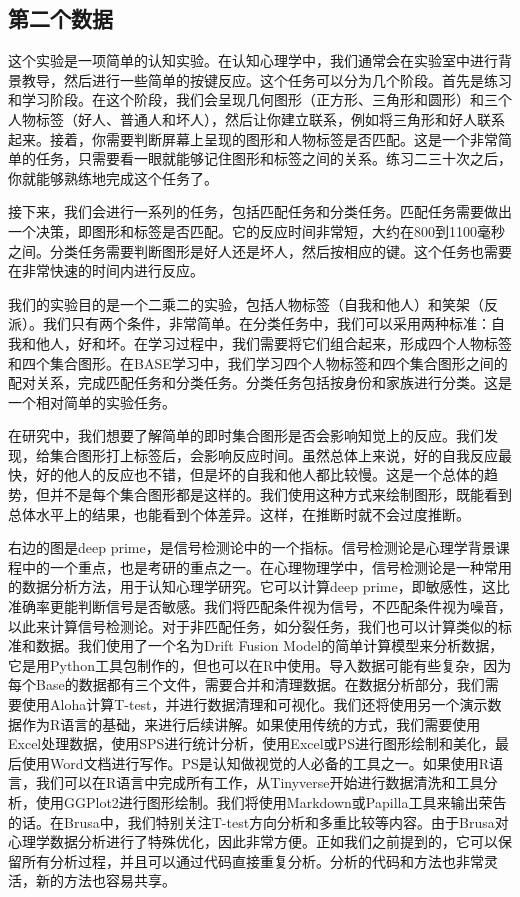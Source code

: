 \documentclass[
  oneside]{book}
\begin{document}
\hypertarget{2-data-2}{%
\subsection{第二个数据}\label{2-data-2}}

这个实验是一项简单的认知实验。在认知心理学中，我们通常会在实验室中进行背景教导，然后进行一些简单的按键反应。这个任务可以分为几个阶段。首先是练习和学习阶段。在这个阶段，我们会呈现几何图形（正方形、三角形和圆形）和三个人物标签（好人、普通人和坏人），然后让你建立联系，例如将三角形和好人联系起来。接着，你需要判断屏幕上呈现的图形和人物标签是否匹配。这是一个非常简单的任务，只需要看一眼就能够记住图形和标签之间的关系。练习二三十次之后，你就能够熟练地完成这个任务了。

接下来，我们会进行一系列的任务，包括匹配任务和分类任务。匹配任务需要做出一个决策，即图形和标签是否匹配。它的反应时间非常短，大约在800到1100毫秒之间。分类任务需要判断图形是好人还是坏人，然后按相应的键。这个任务也需要在非常快速的时间内进行反应。

我们的实验目的是一个二乘二的实验，包括人物标签（自我和他人）和笑架（反派）。我们只有两个条件，非常简单。在分类任务中，我们可以采用两种标准：自我和他人，好和坏。在学习过程中，我们需要将它们组合起来，形成四个人物标签和四个集合图形。在BASE学习中，我们学习四个人物标签和四个集合图形之间的配对关系，完成匹配任务和分类任务。分类任务包括按身份和家族进行分类。这是一个相对简单的实验任务。

在研究中，我们想要了解简单的即时集合图形是否会影响知觉上的反应。我们发现，给集合图形打上标签后，会影响反应时间。虽然总体上来说，好的自我反应最快，好的他人的反应也不错，但是坏的自我和他人都比较慢。这是一个总体的趋势，但并不是每个集合图形都是这样的。我们使用这种方式来绘制图形，既能看到总体水平上的结果，也能看到个体差异。这样，在推断时就不会过度推断。

右边的图是deep prime，是信号检测论中的一个指标。信号检测论是心理学背景课程中的一个重点，也是考研的重点之一。在心理物理学中，信号检测论是一种常用的数据分析方法，用于认知心理学研究。它可以计算deep prime，即敏感性，这比准确率更能判断信号是否敏感。我们将匹配条件视为信号，不匹配条件视为噪音，以此来计算信号检测论。对于非匹配任务，如分裂任务，我们也可以计算类似的标准和数据。我们使用了一个名为Drift Fusion Model的简单计算模型来分析数据，它是用Python工具包制作的，但也可以在R中使用。导入数据可能有些复杂，因为每个Base的数据都有三个文件，需要合并和清理数据。在数据分析部分，我们需要使用Aloha计算T-test，并进行数据清理和可视化。我们还将使用另一个演示数据作为R语言的基础，来进行后续讲解。如果使用传统的方式，我们需要使用Excel处理数据，使用SPS进行统计分析，使用Excel或PS进行图形绘制和美化，最后使用Word文档进行写作。PS是认知做视觉的人必备的工具之一。如果使用R语言，我们可以在R语言中完成所有工作，从Tinyverse开始进行数据清洗和工具分析，使用GGPlot2进行图形绘制。我们将使用Markdown或Papilla工具来输出荣告的话。在Brusa中，我们特别关注T-test方向分析和多重比较等内容。由于Brusa对心理学数据分析进行了特殊优化，因此非常方便。正如我们之前提到的，它可以保留所有分析过程，并且可以通过代码直接重复分析。分析的代码和方法也非常灵活，新的方法也容易共享。
\end{document}
